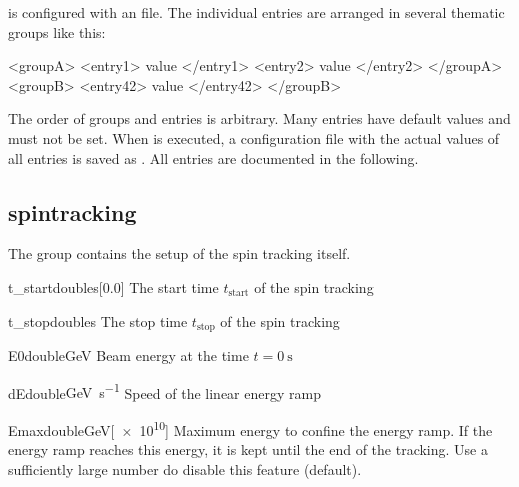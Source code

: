 \documentclass[a4paper]{scrartcl}
\begin{document}
\polem is configured with an \xml file. The individual entries are arranged in several
thematic groups like this:
\begin{xmlcode}
  <groupA>
    <entry1> value </entry1>
    <entry2> value </entry2>
  </groupA>
  <groupB>
    <entry42> value </entry42>
  </groupB>
\end{xmlcode}
The order of groups and entries is arbitrary. Many entries have default values and must
not be set. When \polem is executed, a configuration file with the actual values of all
entries is saved as . All entries are
documented in the following.

\subsection{spintracking}

The group  contains the setup of the spin tracking itself.\\[2mm]

\begin{configdoc}{t_start}{double}{\si{\s}}[0.0]
  The start time $t_\text{start}$ of the spin tracking
\end{configdoc}

\begin{configdoc}{t_stop}{double}{\si{\s}}
  The stop time $t_\text{stop}$ of the spin tracking
\end{configdoc}

\begin{configdoc}{E0}{double}{\si{\GeV}}
  Beam energy at the time $t=\SI{0}{\s}$
\end{configdoc}

\begin{configdoc}{dE}{double}{\si{\GeV\per\s}}
  Speed of the linear energy ramp
\end{configdoc}

\begin{configdoc}{Emax}{double}{\si{\GeV}}[\num{e10}]
  Maximum energy to confine the energy ramp.
  If the energy ramp reaches this energy, it is kept until the end of the tracking. Use a
  sufficiently large number do disable this feature (default).
\end{configdoc}
\end{document}
